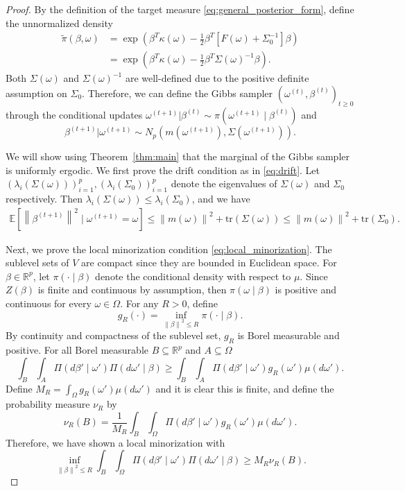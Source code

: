 \documentclass[ejsv2, noshowframe]{imsart}
\theoremstyle{plain}
\theoremstyle{definition}
\theoremstyle{remark}
\newcommand{\norm}[1]{\left\lVert#1\right\rVert}
\newcommand{\w}{\omega}
\newcommand{\tr}{\text{tr}}
\newcommand{\R}{\mathbb{R}}
\newcommand{\E}{\mathbb{E}}
\begin{document}
\begin{proof}
By the definition of the target measure \eqref{eq:general_posterior_form}, define the unnormalized density
\begin{align*}
\tilde{\pi}(\beta, \w)
&= \exp\left( 
\beta^T \kappa(\w) 
- \frac{1}{2} \beta^T \left[ F(\w) + \Sigma_0^{-1} \right] \beta 
\right)
\\
&= \exp\left( 
\beta^T \kappa(\w) 
- \frac{1}{2} \beta^T \Sigma(\w)^{-1} \beta 
\right).
\end{align*}
Both $\Sigma(\w)$ and $\Sigma(\w)^{-1}$ are well-defined due to the positive definite assumption on $\Sigma_0$.
Therefore, we can define the Gibbs sampler $(\w^{(t)}, \beta^{(t)})_{t \ge 0}$ through the conditional updates $\w^{(t+1)} | \beta^{(t)} \sim \pi(\w^{(t+1)} \mid \beta^{(t)})$ and
\[
\beta^{(t+1)} | \w^{(t+1)} \sim N_p(m(\w^{(t+1)}), \Sigma(\w^{(t+1)})).
\]

We will show using Theorem~\ref{thm:main} that the marginal of the Gibbs sampler is uniformly ergodic.
We first prove the drift condition as in \eqref{eq:drift}.
Let $(\lambda_i(\Sigma(\w)))_{i = 1}^p, (\lambda_i(\Sigma_0))_{i = 1}^p$ denote the eigenvalues of $\Sigma(\w)$ and $\Sigma_0$ respectively. 
Then $\lambda_i(\Sigma(\w)) \le \lambda_i(\Sigma_0)$, and we have
\begin{align*}
\E\left[  \norm{ \beta^{(t+1)} }^2 \mid \w^{(t+1)} = \w \right]
\le \norm{m(\w)}^2 + \tr(\Sigma(\w))
\le \norm{m(\w)}^2 + \tr(\Sigma_0).
\end{align*}

Next, we prove the local minorization condition \eqref{eq:local_minorization}.
The sublevel sets of $V$ are compact since they are bounded in Euclidean space.
For $\beta \in \R^p$, let $\pi(\cdot \mid \beta)$ denote the conditional density with respect to $\mu$.
Since $Z(\beta)$ is finite and continuous by assumption, then $\pi(\w \mid \beta)$ is positive and continuous for every $\w \in \Omega$.
For any $R > 0$, define
\[
g_R(\cdot) = \inf_{\norm{\beta}^2 \le R} \pi(\cdot \mid \beta ).
\]
By continuity and compactness of the sublevel set, $g_R$ is Borel measurable and positive.
For all Borel measurable $B \subseteq \R^p$ and $A \subseteq \Omega$
\[
\int_{B} \int_{A} \Pi(d\beta' \mid \w') \Pi(d\w' \mid \beta)
\ge \int_{B} \int_{A} \Pi(d\beta' \mid \w') g_R(\w') \mu(d\w').
\]
Define $M_R = \int_{\Omega} g_R(\w') \mu(d\w')$ and it is clear this is finite, and define the probability measure $\nu_R$ by
\[
\nu_R(B)
= \frac{1}{M_R} \int_{B} \int_{\Omega} \Pi(d\beta' \mid \w') g_R(\w')  \mu(d\w').
\]
Therefore, we have shown a local minorization with
\[
\inf_{\norm{\beta}^2 \le R} \int_{B} \int_{\Omega} \Pi(d\beta' \mid \w') \Pi(d\w' \mid \beta)
\ge M_R \nu_R(B).
\]
\end{proof}
\end{document}
